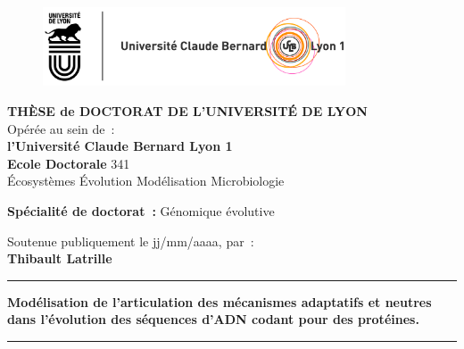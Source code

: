 \thispagestyle{empty}

\unitlength 1cm
\begin{center}
	
	\vspace*{-2.5cm}
	\begin{figure}[h]
		\centering
		\includegraphics[width=0.8\textwidth]{figures/logos.jpg}
	\end{figure}
	
	
	
	{\large \textbf{THÈSE de DOCTORAT DE L'UNIVERSITÉ DE LYON}\\}
	{Opérée au sein de~:\\}
	{\large \textbf{l'Université Claude Bernard Lyon 1}\\}
	\vspace{12pt}
	{\large \textbf{Ecole Doctorale} 341 \\Écosystèmes Évolution Modélisation Microbiologie}
	
	
	\vspace{12pt}
	
	{\large \textbf{Spécialité de doctorat~:} Génomique évolutive
		\\}
	
	\vspace{0.8cm}
	
	{Soutenue publiquement le jj/mm/aaaa, par~:\\}
	{\Large \textbf{Thibault Latrille}}
	\vspace{0.5cm}           
	
	
	\rule{5cm}{1pt}
	\vspace{12pt}
	
	{\huge \textbf{Modélisation de l'articulation des mécanismes adaptatifs et neutres dans l’évolution des séquences d’ADN codant pour des protéines.}\par}
	
	\vspace{12pt}
	\rule{5cm}{1pt}
	
	\vspace{0.5cm}
	
\end{center}

